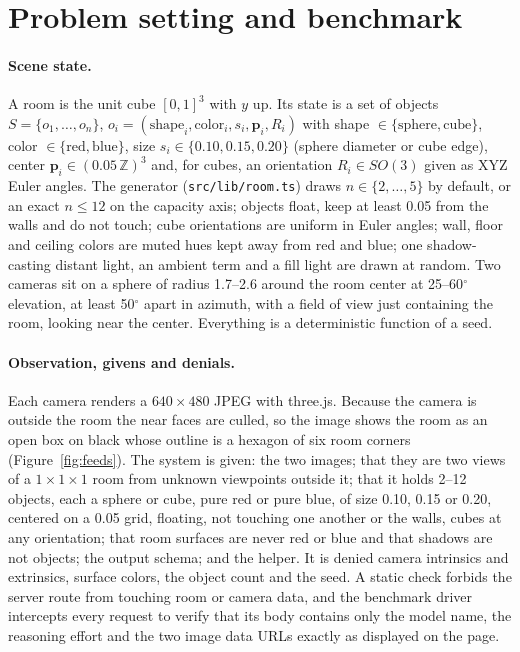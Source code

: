 \documentclass[10pt,a4paper]{article}
\begin{document}
\section{Problem setting and benchmark}
\label{sec:setting}

\paragraph{Scene state.}
A room is the unit cube $[0,1]^3$ with $y$ up. Its state is a set of objects $S=\{o_1,\dots,o_n\}$, $o_i=(\text{shape}_i,\text{color}_i,s_i,\mathbf{p}_i,R_i)$ with shape $\in\{\text{sphere},\text{cube}\}$, color $\in\{\text{red},\text{blue}\}$, size $s_i\in\{0.10,0.15,0.20\}$ (sphere diameter or cube edge), center $\mathbf{p}_i\in(0.05\,\mathbb{Z})^3$ and, for cubes, an orientation $R_i\in SO(3)$ given as XYZ Euler angles. The generator (\texttt{src/lib/room.ts}) draws $n\in\{2,\dots,5\}$ by default, or an exact $n\le 12$ on the capacity axis; objects float, keep at least 0.05 from the walls and do not touch; cube orientations are uniform in Euler angles; wall, floor and ceiling colors are muted hues kept away from red and blue; one shadow-casting distant light, an ambient term and a fill light are drawn at random. Two cameras sit on a sphere of radius 1.7--2.6 around the room center at 25--60$^\circ$ elevation, at least 50$^\circ$ apart in azimuth, with a field of view just containing the room, looking near the center. Everything is a deterministic function of a seed.

\paragraph{Observation, givens and denials.}
Each camera renders a $640\times480$ JPEG with three.js. Because the camera is outside the room the near faces are culled, so the image shows the room as an open box on black whose outline is a hexagon of six room corners (Figure~\ref{fig:feeds}). The system is given: the two images; that they are two views of a $1\times1\times1$ room from unknown viewpoints outside it; that it holds 2--12 objects, each a sphere or cube, pure red or pure blue, of size 0.10, 0.15 or 0.20, centered on a 0.05 grid, floating, not touching one another or the walls, cubes at any orientation; that room surfaces are never red or blue and that shadows are not objects; the output schema; and the helper. It is denied camera intrinsics and extrinsics, surface colors, the object count and the seed. A static check forbids the server route from touching room or camera data, and the benchmark driver intercepts every request to verify that its body contains only the model name, the reasoning effort and the two image data URLs exactly as displayed on the page.
\end{document}
